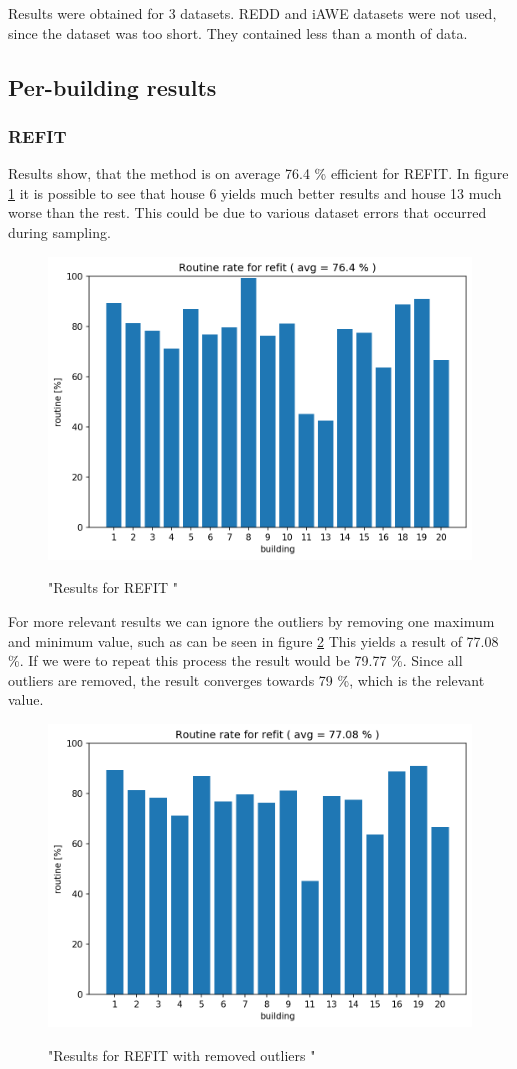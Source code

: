 Results were obtained for 3 datasets. 
REDD and iAWE datasets were not used, since the dataset was too short. 
They contained less than a month of data. 

\subsection{Per-building results}
\subsubsection{REFIT}

Results show, that the method is on average 76.4 \% efficient for REFIT.  
In figure \ref{fig:refit_res} it is possible to see that house 6 yields much better results and house 13 much worse than the rest. 
This could be due to various dataset errors that occurred during sampling.

\begin{figure}[H]
	\centering
	\caption{"Results for REFIT "}
	\includegraphics[width=.8\textwidth]{Figures/EC/refit_res.png}
	\label{fig:refit_res}
\end{figure}

For more relevant results we can ignore the outliers by removing one maximum and minimum value, such as can be seen in figure \ref{fig:refit_res2}
This yields a result of 77.08 \%.
If we were to repeat this process the result would be 79.77 \%.
Since all outliers are removed, the result converges towards 79 \%, which is the relevant value. 

\begin{figure}[H]
	\centering
	\caption{"Results for REFIT with removed outliers "}
	\includegraphics[width=.8\textwidth]{Figures/EC/refit_res2.png}
	\label{fig:refit_res2}
\end{figure}


